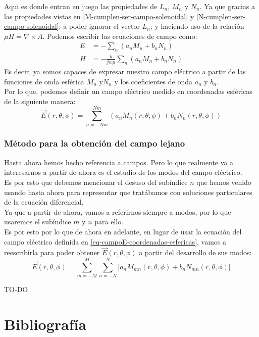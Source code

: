 \documentclass{article}
\begin{document}
Aqui es donde entran en juego las propiedades de $L_{n}$, $M_{n}$ y $N_{n}$. Ya que gracias  a las propiedades vistas en \eqref{M-cumplen-ser-campo-solenoidal} y \eqref{N-cumplen-ser-campo-solenoidal}; a poder ignorar el vector $L_{n}$; y haciendo uso de la relación $\mu H = \nabla \times A$. Podemos escribir las ecuaciones de campo como:
\begin{align}
    E &= - \sum_{n}(a_{n}M_{n}+b_{n}N_{n})\\
    H &= - \frac{k}{jw\mu}\sum_{n}(a_{n}M_{n}+b_{n}N_{n})
\end{align}
Es decir, ya somos capaces de expresar nuestro campo eléctrico a partir de las funciones de onda esférica $M_{n}$ y$N_{n}$ y los coeficientes de onda $a_{n}$ y $b_{n}$. \\
Por lo que, podemos definir un campo eléctrico medido en coordenadas esféricas de la siguiente manera:
\begin{equation}
\vec{E}(r,\theta,\phi)=\sum_{n=-Nm}^{Nm}(a_{n}M_{n}(r,\theta,\phi)+b_{n}N_{n}(r,\theta,\phi))
\label{eq-campoE-coordenadas-esfericas}
\end{equation}
\newpage
\subsubsection{Método para la obtención del campo lejano}
Hasta ahora hemos hecho referencia a campos. Pero lo que realmente va a interesarnos a partir de ahora es el estudio de los  modos del campo eléctrico.\\
Es por esto que debemos mencionar el desuso  del subíndice  $n$ que hemos venido usando hasta ahora para representar que tratábamos con soluciones particulares de la ecuación diferencial.\\
Ya que a partir de ahora, vamos a referirnos siempre a modos, por lo que usaremos el subíndice $m$ y $n$ para ello.\\

Es por esto por lo que de ahora en adelante, en lugar de usar la ecuación del campo eléctrico definida en \eqref{eq-campoE-coordenadas-esfericas}, vamos a reescribirla para poder obtener $\vec{E}(r,\theta,\phi)$ a partir del desarrollo de sus modos:
\begin{equation}
\vec{E}(r,\theta,\phi)=\sum_{m=-M}^{M}\sum_{n=-N}^{N}\big[a_{n}M_{mn}(r,\theta,\phi)+b_{n}N_{mn}(r,\theta,\phi)\big]
\label{eq-campoE-coordenadas-esfericas-a-partir-de-sus-modos}
\end{equation}

TO-DO

\newpage

\newpage
\section{Bibliografía}
\printbibliography
\end{document}
